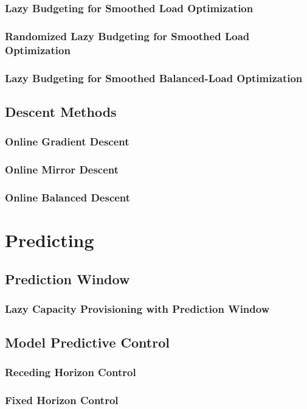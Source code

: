 \subsubsection{Lazy Budgeting for Smoothed Load Optimization}

\subsubsection{Randomized Lazy Budgeting for Smoothed Load Optimization}

\subsubsection{Lazy Budgeting for Smoothed Balanced-Load Optimization}

\subsection{Descent Methods}\label{section:online_algorithms:md:descent_methods}

\subsubsection{Online Gradient Descent}

\subsubsection{Online Mirror Descent}

\subsubsection{Online Balanced Descent}

\section{Predicting}

\subsection{Prediction Window}

\subsubsection{Lazy Capacity Provisioning with Prediction Window}

\subsection{Model Predictive Control}

\subsubsection{Receding Horizon Control}

\subsubsection{Fixed Horizon Control}
